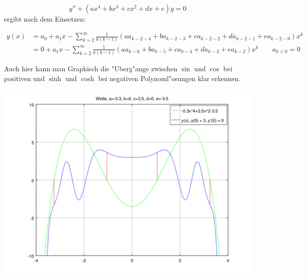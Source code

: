 \begin{equation*}
	y''+(ax^4+bx^3+cx^2+dx+e)y = 0
\end{equation*}
ergibt nach dem Einsetzen:

\begin{equation*}
\begin{split}
	y(x) &= a_0+a_1x-\sum_{k=2}^{\infty} \frac{1}{k(k-1)} (aa_{k-2-4} + 
	ba_{k-2-3} + ca_{k-2-2} + da_{k-2-1} +ea_{k-2-0})x^k
	\\
	&= 0+a_1x-\sum_{k=2}^{\infty} \frac{1}{k(k-1)} (aa_{k-6} + ba_{k-5} + 
	ca_{k-4} + da_{k-3} +ea_{k-2})x^k \qquad a_{k<0} = 0
\end{split}
\end{equation*}

Auch hier kann man Graphisch die "Uberg"ange zwischen $\sin$ und $\cos$ bei 
positiven und $\sinh$ und $\cosh$ bei negativen Polynoml"osungen klar erkennen.

\begin{center}
	\includegraphics[scale=0.55]{./wellen/images/allgemein/n4.png}
\end{center}